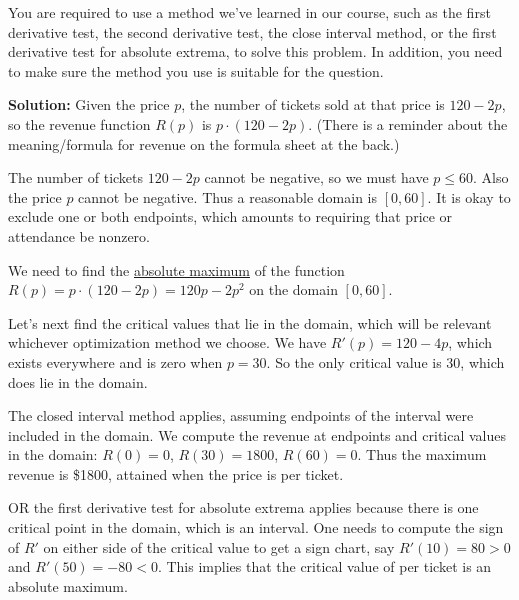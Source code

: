 \documentclass[11pt]{article}
\begin{document}
\begin{enumerate}
You are required to use a method we've learned in our course, such as the first derivative test, the second derivative test, the close interval method, or the first derivative test for absolute extrema, to solve this problem. In addition, you need to make sure the method you use is suitable for the question.

\vspace{.4in}

{\color{blue}\textbf{Solution:} Given the price $p$, the number of tickets sold at that price is $120-2p$, so the revenue function $R(p)$ is $p \cdot (120-2p)$.  (There is a reminder about the meaning/formula for revenue on the formula sheet at the back.)

The number of tickets $120-2p$ cannot be negative, so we must have $p \leq 60$.  Also the price $p$ cannot be negative.  Thus a reasonable domain is $[0,60]$.  It is okay to exclude one or both endpoints, which amounts to requiring that price or attendance be nonzero.

We need to find the \underline{absolute maximum} of the function $R(p) = p \cdot (120-2p) = 120p - 2p^2$ on the domain $[0,60]$.

Let's next find the critical values that lie in the domain, which will be relevant whichever optimization method we choose.  We have $R'(p) = 120 - 4p$, which exists everywhere and is zero when $p=30$.  So the only critical value is 30, which does lie in the domain.

The closed interval method applies, assuming endpoints of the interval were included in the domain.  We compute the revenue at endpoints and critical values in the domain: $R(0)=0$, $R(30) = 1800$, $R(60)=0$.  Thus the maximum revenue is \$1800, attained when the price is  per ticket.

OR the first derivative test for absolute extrema applies because there is one critical point in the domain, which is an interval.  One needs to compute the sign of $R'$ on either side of the critical value to get a sign chart, say $R'(10) = 80 > 0$ and $R'(50) = -80 < 0$.  This implies that the critical value of  per ticket is an absolute maximum.

}


\newpage



\end{enumerate}
\end{document}
